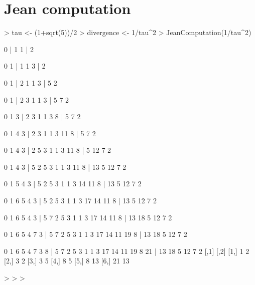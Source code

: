 \documentclass[a4paper]{article}
\begin{document}
\section{Jean computation}



\begin{Schunk}
\begin{Sinput}
> tau <- (1+sqrt(5))/2
> divergence <- 1/tau^2
> JeanComputation(1/tau^2)
\end{Sinput}
\begin{Soutput}
   0 |   1 
   1 |   2 

   0   1 |   1 
   1   3 |   2 

   0   1 |   2   1 
   1   3 |   5   2 

   0   1 |   2   3   1 
   1   3 |   5   7   2 

   0   1   3 |   2   3   1 
   1   3   8 |   5   7   2 

   0   1   4   3 |   2   3   1 
   1   3  11   8 |   5   7   2 

   0   1   4   3 |   2   5   3   1 
   1   3  11   8 |   5  12   7   2 

   0   1   4   3 |   5   2   5   3   1 
   1   3  11   8 |  13   5  12   7   2 

   0   1   5   4   3 |   5   2   5   3   1 
   1   3  14  11   8 |  13   5  12   7   2 

   0   1   6   5   4   3 |   5   2   5   3   1 
   1   3  17  14  11   8 |  13   5  12   7   2 

   0   1   6   5   4   3 |   5   7   2   5   3   1 
   1   3  17  14  11   8 |  13  18   5  12   7   2 

   0   1   6   5   4   7   3 |   5   7   2   5   3   1 
   1   3  17  14  11  19   8 |  13  18   5  12   7   2 

   0   1   6   5   4   7   3   8 |   5   7   2   5   3   1 
   1   3  17  14  11  19   8  21 |  13  18   5  12   7   2 
     [,1] [,2]
[1,]    1    2
[2,]    3    2
[3,]    3    5
[4,]    8    5
[5,]    8   13
[6,]   21   13
\end{Soutput}
\begin{Sinput}
> 
> 
> 
\end{Sinput}
\end{Schunk}
\end{document}
